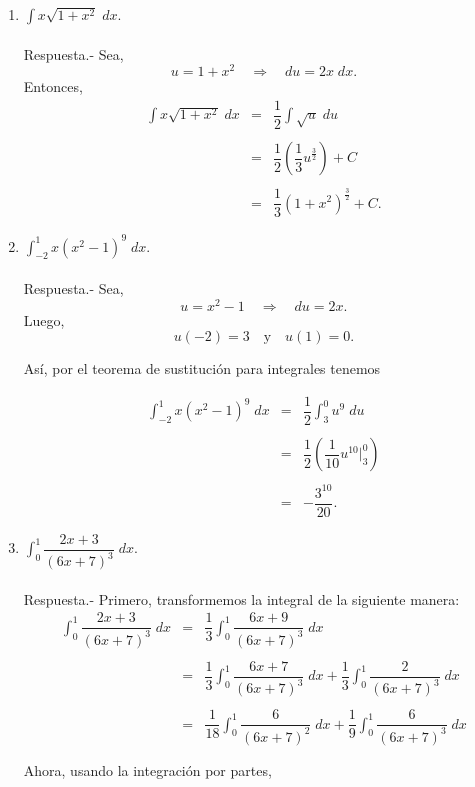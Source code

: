 \begin{enumerate}[\bfseries 1.]
    \item $\displaystyle\int x \sqrt{1+x^2}\; dx.$\\\\
	Respuesta.-\; Sea,
	$$u=1+x^2\quad \Rightarrow \quad du=2x\; dx.$$
	Entonces,
	$$
	\begin{array}{rcl}
	    \displaystyle\int x\sqrt{1+x^2}\; dx &=& \dfrac{1}{2}\displaystyle\int \sqrt{u}\; du\\\\
						 &=& \dfrac{1}{2}\left(\dfrac{1}{3}u^{\frac{3}{2}}\right)+C\\\\
						 &=&\dfrac{1}{3}\left(1+x^2\right)^{\frac{3}{2}}+C.
	 \end{array}
	$$
	\vspace{.5cm}

    \item $\displaystyle\int_{-2}^1 x\left(x^2-1\right)^9\; dx.$\\\\
	Respuesta.-\; Sea,
	$$u=x^2-1\quad \Rightarrow \quad du=2x.$$
	Luego,
	$$u(-2)=3\quad \mbox{y} \quad u(1)=0.$$

	Así, por el teorema de sustitución para integrales tenemos

	$$
	\begin{array}{rcl}
	    \displaystyle\int_{-2}^1 x\left(x^2-1\right)^9\; dx &=&\dfrac{1}{2}\displaystyle\int_3^0 u^9\; du\\\\ 
								&=& \dfrac{1}{2}\left(\dfrac{1}{10}u^{10}\bigg|_3^0\right)\\\\
								&=& -\dfrac{3^10}{20}.
	\end{array}
	$$
	\vspace{.5cm}

    \item $\displaystyle\int_0^1 \dfrac{2x+3}{(6x+7)^3}\; dx.$\\\\
	Respuesta.-\; Primero, transformemos la integral de la siguiente manera:
	$$
	\begin{array}{rcl}
	    \displaystyle\int_0^1 \dfrac{2x+3}{(6x+7)^3}\; dx &=& \dfrac{1}{3}\displaystyle\int_0^1 \dfrac{6x+9}{(6x+7)^3}\; dx\\\\
							      &=& \dfrac{1}{3}\displaystyle\int_0^1 \dfrac{6x+7}{(6x+7)^3}\;dx+\dfrac{1}{3}\int_0^1 \dfrac{2}{(6x+7)^3}\; dx\\\\
							      &=& \dfrac{1}{18}\displaystyle\int_0^1 \dfrac{6}{(6x+7)^2}\;dx+\dfrac{1}{9}\displaystyle\int_0^1 \dfrac{6}{(6x+7)^3}\; dx\\\\
	\end{array}
	$$
	Ahora, usando la integración por partes, 


\end{enumerate}
